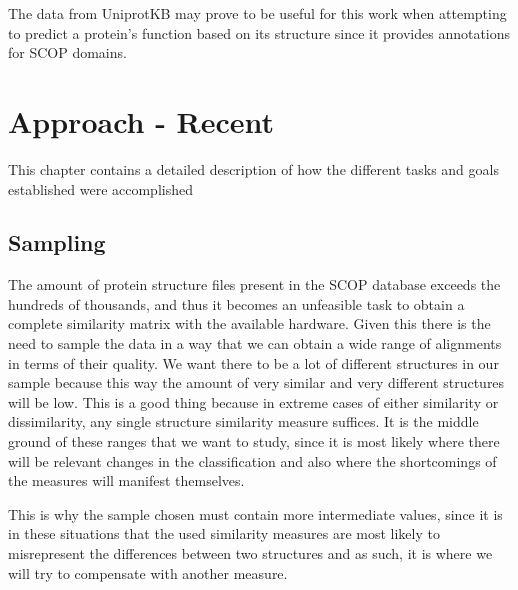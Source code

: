 The data from UniprotKB may prove to be useful for this work when attempting to predict a protein's function based on its structure since it provides annotations for \gls{SCOP} domains.


\chapter{Approach - Recent}
This chapter contains a detailed description of how the different tasks and goals established were accomplished

\section{Sampling}

The amount of protein structure files present in the SCOP database exceeds the hundreds of thousands, and thus it becomes an unfeasible task to obtain a complete similarity matrix with the available hardware. Given this there is the need to sample the data in a way that we can obtain a wide range of alignments in terms of their quality. We want there to be a lot of different structures in our sample because this way the amount of very similar and very different structures will be low. This is a good thing because in extreme cases of either similarity or dissimilarity, any single structure similarity measure suffices. It is the middle ground of these ranges that we want to study, since it is most likely where there will be relevant changes in the classification and also where the shortcomings of the measures will manifest themselves.

This is why the sample chosen must contain more intermediate values, since it is in these situations that the used similarity measures are most likely to misrepresent the differences between two structures and as such, it is where we will try to compensate with another measure.


